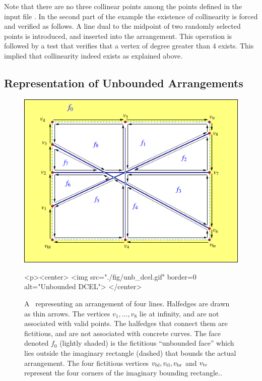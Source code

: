 
Note that there are no three collinear points among the points defined
in the input file . In the second part of the example
the existence of collinearity is forced and verified as follows. A line
dual to the midpoint of two randomly selected points is introduced,
and inserted into the arrangement. This operation is followed by a
test that verifies that a vertex of degree greater than $4$
exists. This implied that collinearity indeed exists as explained above.

\begin{ccAdvanced}

\subsection{Representation of Unbounded Arrangements\label{arr_ssec:unb_rep}}

\begin{figure}[t]
\begin{ccTexOnly}
  \begin{center}
  \includegraphics{Arrangement_on_surface_2/fig/unb_dcel}
  \end{center}
\end{ccTexOnly}
\begin{ccHtmlOnly}
  <p><center>
  <img src="./fig/unb_dcel.gif" border=0 alt="Unbounded DCEL">
  </center>
\end{ccHtmlOnly}
\caption{A \dcel\ representing an arrangement of four lines.
Halfedges are drawn as thin arrows. The vertices $v_1, \ldots, v_8$
lie at infinity, and are not associated with valid points. The
halfedges that connect them are fictitious, and are not associated
with concrete curves. The face denoted $f_0$ (lightly shaded)
is the fictitious ``unbounded face'' which lies outside the imaginary
rectangle (dashed) that bounds the actual arrangement. The four
fictitious vertices $v_{\rm bl}, v_{\rm tl}, v_{\rm br}$ and
$v_{\rm tr}$ represent the four corners of the imaginary bounding
rectangle..\label{arr_fig:unb_dcel}}
\end{figure}


\end{ccAdvanced}
